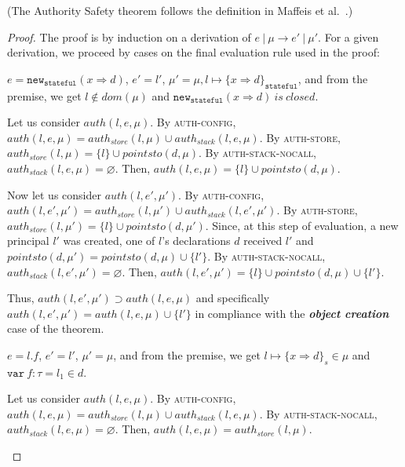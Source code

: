 \documentclass{llncs}
\newcommand{\keywadj}[1]{\mathtt{#1}}
\newcommand{\keyw}[1]{\keywadj{#1}~}
\newcommand{\pcase}[1][]{
  \if\relax\detokenize{#1}\relax
    \def\thiscase{}
  \else
    \def\thiscase{~#1}
  \fi
  \item
}
\begin{document}
\begin{theorem}
\end{theorem}

(The Authority Safety theorem follows the definition in Maffeis et al.~\cite{Maffeis:2010}.)

\begin{proof} The proof is by induction on a derivation of $e~|~\mu \longrightarrow e'~|~\mu'$. For a given derivation, we proceed by cases on the final evaluation rule used in the proof:

\sloppy 

\begin{pcases}
\pcase[\textsc{E-New}]
$e = \keywadj{new}_{\keywadj{stateful}}(x \Rightarrow d)$, $e' = l'$, $\mu' = \mu, l \mapsto \{ x \Rightarrow d \}_{\keywadj{stateful}}$, and from the premise, we get $l \not\in dom(\mu)$ and $\keywadj{new}_{\keywadj{stateful}}(x \Rightarrow d)~is~closed$.

\hspace{12pt} Let us consider $auth(l, e, \mu)$. By \textsc{auth-config}, $auth(l, e, \mu) = auth_{store}(l, \mu) \cup auth_{stack}(l,e,\mu)$. By \textsc{auth-store}, $auth_{store}(l,\mu) = \{ l \} \cup pointsto(d,\mu)$. By \textsc{auth-stack-nocall}, $auth_{stack}(l, e, \mu) = \varnothing$. Then, $auth(l, e, \mu) = \{ l \} \cup pointsto(d, \mu)$.

\hspace{12pt} Now let us consider $auth(l, e', \mu')$. By \textsc{auth-config}, $auth(l, e', \mu') = auth_{store}(l, \mu') \cup auth_{stack}(l, e',\mu')$. By \textsc{auth-store}, $auth_{store}(l,\mu') = \{ l \} \cup pointsto(d,\mu')$. Since, at this step of evaluation, a new principal $l'$ was created, one of $l$'s declarations $d$ received $l'$ and $pointsto(d, \mu') = pointsto(d, \mu) \cup \{ l' \}$. By \textsc{auth-stack-nocall}, $auth_{stack}(l, e', \mu') = \varnothing$. Then, $auth(l, e', \mu') = \{ l \} \cup pointsto(d, \mu) \cup \{ l' \}$.

\hspace{12pt} Thus, $auth(l, e', \mu') \supset auth(l, e, \mu)$ and specifically $auth(l, e', \mu') = auth(l, e, \mu) \cup \{ l' \}$ in compliance with the \textbf{\textit{object creation}} case of the theorem.
\\
\pcase[\textsc{E-Field}]
$e = l.f$, $e' = l'$, $\mu' = \mu$, and from the premise, we get $l \mapsto \{ x \Rightarrow d \}_{s} \in \mu$ and $\keyw{var} f:\tau = l_1 \in d$.

\hspace{12pt} Let us consider $auth(l, e, \mu)$. By \textsc{auth-config}, $auth(l, e, \mu) = auth_{store}(l, \mu) \cup auth_{stack}(l,e,\mu)$. By \textsc{auth-stack-nocall}, $auth_{stack}(l, e, \mu) = \varnothing$. Then, $auth(l, e, \mu) = auth_{store}(l, \mu)$.


\end{pcases}
\end{proof}
\end{document}
